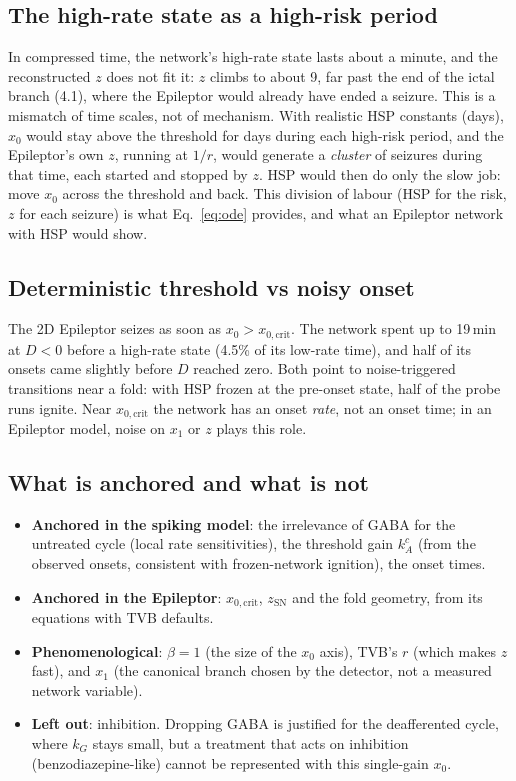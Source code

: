 \documentclass[11pt]{article}
\newcommand{\kA}{k_A}
\newcommand{\kG}{k_G}
\newcommand{\xc}{x_{0,\mathrm{crit}}}
\newcommand{\zsn}{z_{\mathrm{SN}}}
\begin{document}
\subsection{The high-rate state as a high-risk period}
In compressed time, the network's high-rate state lasts about a minute, and the reconstructed $z$ does not fit it: $z$
climbs to about 9, far past the end of the ictal branch (4.1), where the Epileptor would already have ended a seizure.
This is a mismatch of time scales, not of mechanism. With realistic HSP constants (days), $x_0$ would stay above the
threshold for days during each high-risk period, and the Epileptor's own $z$, running at $1/r$, would generate a
\emph{cluster} of seizures during that time, each started and stopped by $z$. HSP would then do only the slow job: move
$x_0$ across the threshold and back. This division of labour (HSP for the risk, $z$ for each seizure) is what
Eq.~\eqref{eq:ode} provides, and what an Epileptor network with HSP would show.

\subsection{Deterministic threshold vs noisy onset}
The 2D Epileptor seizes as soon as $x_0>\xc$. The network spent up to 19\,min at $D<0$ before a high-rate state (4.5\% of
its low-rate time), and half of its onsets came slightly before $D$ reached zero. Both point to noise-triggered
transitions near a fold: with HSP frozen at the pre-onset state, half of the probe runs ignite. Near $\xc$ the network
has an onset \emph{rate}, not an onset time; in an Epileptor model, noise on $x_1$ or $z$ plays this role.

\subsection{What is anchored and what is not}
\begin{itemize}
\item \textbf{Anchored in the spiking model}: the irrelevance of GABA for the untreated cycle (local rate sensitivities),
the threshold gain $\kA^c$ (from the observed onsets, consistent with frozen-network ignition), the onset times.
\item \textbf{Anchored in the Epileptor}: $\xc$, $\zsn$ and the fold geometry, from its equations with TVB defaults.
\item \textbf{Phenomenological}: $\beta=1$ (the size of the $x_0$ axis), TVB's $r$ (which makes $z$ fast), and $x_1$ (the
canonical branch chosen by the detector, not a measured network variable).
\item \textbf{Left out}: inhibition. Dropping GABA is justified for the deafferented cycle, where $\kG$ stays small, but a
treatment that acts on inhibition (benzodiazepine-like) cannot be represented with this single-gain $x_0$.
\end{itemize}
\end{document}

